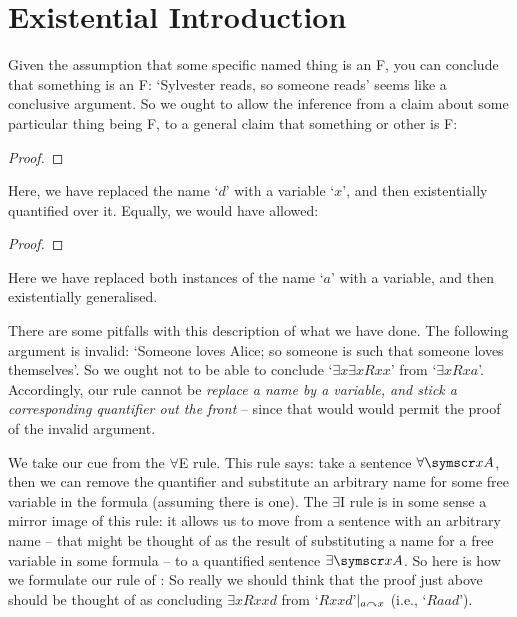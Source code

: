 \section{Existential Introduction}\label{exint}
Given the assumption that some specific named thing is an F, you can conclude that something is an F: `Sylvester reads, so someone reads' seems like a conclusive argument. So we ought to allow the inference from a claim about some particular thing being F, to a general claim that something or other is F:
\begin{proof}
	 
\end{proof}
Here, we have replaced the name `$d$' with a variable `$x$', and then existentially quantified over it. Equally, we would have allowed:
\begin{proof}
	 
\end{proof}
Here we have replaced both instances of the name `$a$' with a variable, and then existentially generalised. 

There are some pitfalls with this description of what we have done. The following argument is invalid: `Someone loves Alice; so someone is such that someone loves themselves'. So we ought not to be able to conclude `$\exists x \exists x Rxx$' from `$\exists x Rxa$'. Accordingly, our rule cannot be \emph{replace a name by a variable, and stick a corresponding quantifier out the front} – since that would would permit the proof of the invalid argument.

We take our cue from the $\forall$E rule. This rule says: take a sentence $\forall\meta{xA}$, then we can remove the quantifier and substitute an arbitrary name for some free variable in the formula  (assuming there is one). The $\exists$I rule is in some sense a mirror image of this rule: it allows us to move from a sentence with an arbitrary name – that might be thought of as the result of substituting a name for a free variable in some formula  – to a quantified sentence $\exists \meta{xA}$. So here is how we formulate our rule of :
 So really we should think that the proof just above should be thought of as concluding $\exists x Rxxd$ from `$Rxxd$'$\vert_{a\curvearrowright x}$ (i.e., `$Raad$').


